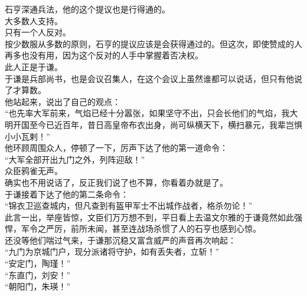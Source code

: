 \begin{multicols}{\theparacolNo}
石亨深通兵法，他的这个提议也是行得通的。\\

大多数人支持。\\

只有一个人反对。\\

按少数服从多数的原则，石亨的提议应该是会获得通过的。但这次，即使赞成的人再多也没有用，因为这个反对的人手中掌握着否决权。\\

此人正是于谦。\\

于谦是兵部尚书，也是会议召集人，在这个会议上虽然谁都可以说话，但只有他说了才算数。\\

他站起来，说出了自己的观点：\\

“也先率大军前来，气焰已经十分嚣张，如果坚守不出，只会长他们的气焰，我大明开国至今已近百年，昔日高皇帝布衣出身，尚可纵横天下，横扫暴元，我辈岂惧小小瓦剌！”\\

他环顾周围众人，停顿了一下，厉声下达了他的第一道命令：\\

“大军全部开出九门之外，列阵迎敌！”\\

众臣鸦雀无声。\\

确实也不用说话了，反正我们说了也不算，你看着办就是了。\\

于谦接着下达了他的第二条命令：\\

“锦衣卫巡查城内，但凡查到有盔甲军士不出城作战者，格杀勿论！”\\

此言一出，举座皆惊，文臣们万万想不到，平日看上去温文尔雅的于谦竟然如此强悍，军令之严厉，前所未闻，甚至连战场杀惯了人的石亨也感到心惊。\\

还没等他们喘过气来，于谦那沉稳又富含威严的声音再次响起：\\

“九门为京城门户，现分派诸将守护，如有丢失者，立斩！”\\

“安定门，陶瑾！”\\

“东直门，刘安！”\\

“朝阳门，朱瑛！”\\


\end{multicols}
